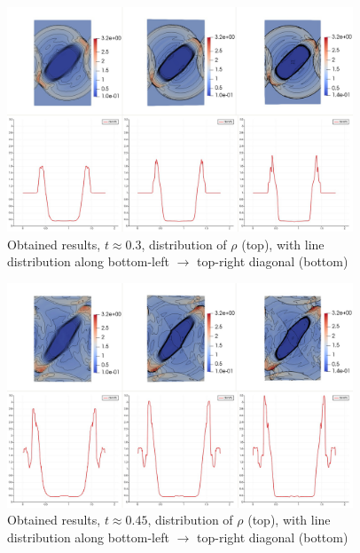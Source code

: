 \begin{figure}[H]
	\begin{center}
		\includegraphics[width=0.92\textwidth]{img/mhd-blast/new/blast,1noadapt5.jpg}
	\caption{Obtained results, $t \approx 0.3$, distribution of $\rho$ (top), with line distribution along bottom-left $\rightarrow$ top-right diagonal (bottom)}
	\label{figure:blastNew13}
	\end{center}
\end{figure}
\vspace{-8mm}

\begin{figure}[H]
	\begin{center}
		\includegraphics[width=0.92\textwidth]{img/mhd-blast/new/blast,1noadapt9.jpg}
	\caption{Obtained results, $t \approx 0.45$, distribution of $\rho$ (top), with line distribution along bottom-left $\rightarrow$ top-right diagonal (bottom)}
	\label{figure:blastNew14}
	\end{center}
\end{figure}
\vspace{-8mm}

